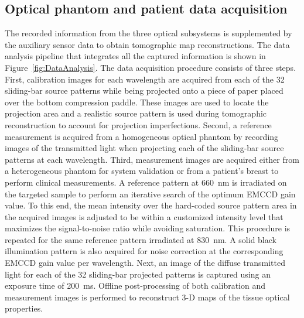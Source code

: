 \subsection{Optical phantom and patient data acquisition}
\label{Sec:DataAcquisition}
The recorded information from the three optical subsystems is supplemented by the auxiliary sensor data to obtain tomographic map reconstructions. The data analysis pipeline that integrates all the captured information is shown in Figure~\ref{fig:DataAnalysis}. The data acquisition procedure consists of three steps. First, calibration images for each wavelength are acquired from each of the 32 sliding-bar source patterns while being projected onto a piece of paper placed over the bottom compression paddle. These images are used to locate the projection area and a realistic source pattern is used during tomographic reconstruction to account for projection imperfections. Second, a reference measurement is acquired from a homogeneous optical phantom by recording images of the transmitted light when projecting each of the sliding-bar source patterns at each wavelength. Third, measurement images are acquired either from a heterogeneous phantom for system validation or from a patient's breast to perform clinical measurements. A reference pattern at 660~nm is irradiated on the targeted sample to perform an iterative search of the optimum \ac{EMCCD} gain value. To this end, the mean intensity over the hard-coded source pattern area in the acquired images is adjusted to be within a customized intensity level that maximizes the signal-to-noise ratio while avoiding saturation. This procedure is repeated for the same reference pattern irradiated at 830~nm. A solid black illumination pattern is also acquired for noise correction at the corresponding \ac{EMCCD} gain value per wavelength. Next, an image of the diffuse transmitted light for each of the 32 sliding-bar projected patterns is captured using an exposure time of 200~ms. Offline post-processing of both calibration and measurement images is performed to reconstruct 3-D maps of the tissue optical properties.

